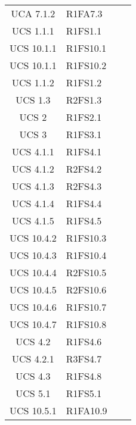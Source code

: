 {\begin{longtable}{ c C{4cm} c c}
UCA 7.1.2 & R1FA7.3\\

UCS 1.1.1 & R1FS1.1\\

UCS 10.1.1 & R1FS10.1\\


UCS 10.1.1 & R1FS10.2\\

UCS 1.1.2 & R1FS1.2\\

UCS 1.3 & R2FS1.3\\

UCS 2 & R1FS2.1\\

UCS 3 & R1FS3.1\\


UCS 4.1.1 & R1FS4.1\\

UCS 4.1.2 & R2FS4.2\\

UCS 4.1.3 & R2FS4.3\\

UCS 4.1.4 & R1FS4.4\\

UCS 4.1.5 & R1FS4.5\\



UCS 10.4.2 & R1FS10.3\\

UCS 10.4.3 & R1FS10.4\\

UCS 10.4.4 & R2FS10.5\\

UCS 10.4.5 & R2FS10.6\\

UCS 10.4.6 & R1FS10.7\\

UCS 10.4.7 & R1FS10.8\\

UCS 4.2 & R1FS4.6\\


UCS 4.2.1 & R3FS4.7\\

UCS 4.3 & R1FS4.8\\

UCS 5.1 & R1FS5.1\\

UCS 10.5.1 & R1FA10.9\\


\end{longtable}}
